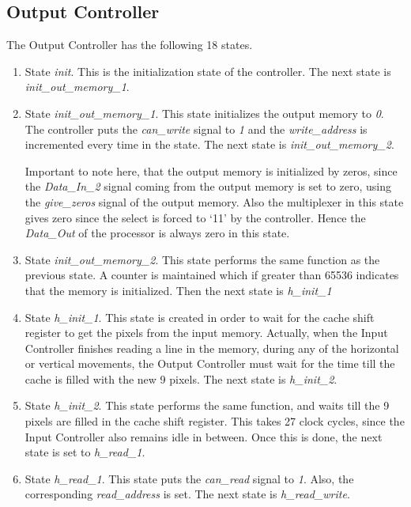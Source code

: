 \documentclass[11pt,a4paper]{article}
\begin{document}
\subsection{Output Controller}
The Output Controller has the following 18 states.
\begin{enumerate}
\item State \textit{init}. This is the initialization state of the controller. The next state is \textit{init\_out\_memory\_1}.

\item State \textit{init\_out\_memory\_1}. This state initializes the output memory to \textit{0}. The controller puts the \textit{can\_write} signal to \textit{1} and the \textit{write\_address} is incremented every time in the state. The next state is \textit{init\_out\_memory\_2}.

Important to note here, that the output memory is initialized by zeros, since the \textit{Data\_In\_2} signal coming from the output memory is set to zero, using the \textit{give\_zeros} signal of the output memory. Also the multiplexer in this state gives zero since the select is forced to `11' by the controller. Hence the \textit{Data\_Out} of the processor is always zero in this state.

\item State \textit{init\_out\_memory\_2}. This state performs the same function as the previous state. A counter is maintained which if greater than 65536 indicates that the memory is initialized. Then the next state is \textit{h\_init\_1}

\item State \textit{h\_init\_1}. This state is created in order to wait for the cache shift register to get the pixels from the input memory. Actually, when the Input Controller finishes reading a line in the memory, during any of the horizontal or vertical movements, the Output Controller must wait for the time till the cache is filled with the new 9 pixels. The next state is \textit{h\_init\_2}.

\item State \textit{h\_init\_2}. This state performs the same function, and waits till the 9 pixels are filled in the cache shift register. This takes 27 clock cycles, since the Input Controller also remains idle in between. Once this is done, the next state is set to \textit{h\_read\_1}. 

\item State \textit{h\_read\_1}. This state puts the \textit{can\_read} signal to \textit{1}. Also, the corresponding \textit{read\_address} is set. The next state is \textit{h\_read\_write}.


\end{enumerate}
\end{document}

